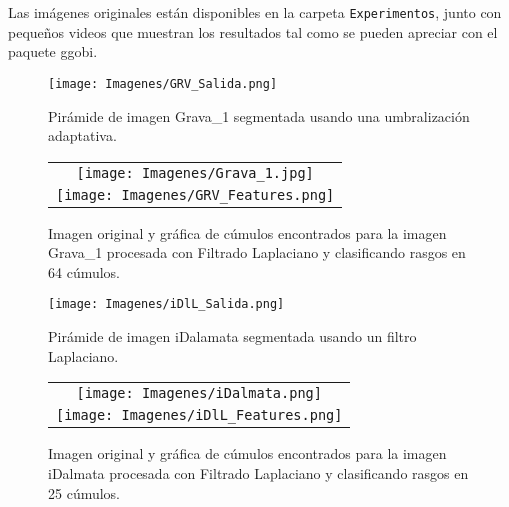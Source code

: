 \documentclass[12pt,letterpaper,notitlepage]{report}
\newlength{\spacing} \setlength{\spacing}{\baselineskip}
\newcommand{\nspace}[1]{\setlength{\baselineskip}{#1\spacing}}
\newenvironment{linespacing}[1]{\nspace{#1}}{}
\begin{document}
{\begin{linespacing}{1.5}
Las imágenes originales están disponibles en la carpeta \verb!Experimentos!, junto con pequeños videos que muestran los resultados tal como se pueden apreciar con el paquete ggobi.


\begin{figure}[!p]
  \centering
  \texttt{[image: Imagenes/GRV\_Salida.png]}
  \caption{Pirámide de imagen Grava\_1 segmentada usando una umbralización adaptativa.} 
\end{figure}

\begin{figure}[!p]
  \centering
  \begin{tabular}{c}
    \texttt{[image: Imagenes/Grava\_1.jpg]}\\
    \texttt{[image: Imagenes/GRV\_Features.png]} 
  \end{tabular}
  \caption{Imagen original y gráfica de cúmulos encontrados para la imagen Grava\_1 procesada con Filtrado Laplaciano y clasificando rasgos en 64 cúmulos.}
\end{figure}


\begin{figure}[!p]
  \centering
  \texttt{[image: Imagenes/iDlL\_Salida.png]}
  \caption{Pirámide de imagen iDalamata segmentada usando un filtro Laplaciano.} 
\end{figure}



\begin{figure}[!p]
  \centering
  \begin{tabular}{c}
    \texttt{[image: Imagenes/iDalmata.png]} \\
    \texttt{[image: Imagenes/iDlL\_Features.png]}
  \end{tabular}
  \caption{Imagen original y gráfica de cúmulos encontrados para la imagen iDalmata procesada con Filtrado Laplaciano y clasificando rasgos en 25 cúmulos.}
\end{figure}


\end{linespacing}}
\end{document}
